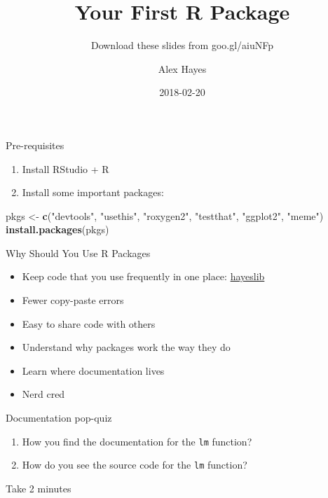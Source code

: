 \documentclass[12pt,ignorenonframetext,compress]{beamer}
\title{Your First R Package}
\subtitle{Download these slides from goo.gl/aiuNFp}
\author{Alex Hayes}
\date{2018-02-20}
\newenvironment{Shaded}{\begin{snugshade}}{\end{snugshade}}
\newcommand{\KeywordTok}[1]{\textcolor[rgb]{0.13,0.29,0.53}{\textbf{#1}}}
\newcommand{\StringTok}[1]{\textcolor[rgb]{0.31,0.60,0.02}{#1}}
\newcommand{\NormalTok}[1]{#1}
\providecommand{\tightlist}{%
  \setlength{\itemsep}{0pt}\setlength{\parskip}{0pt}}
\begin{document}
\frame{\titlepage}

\begin{frame}[fragile]{Pre-requisites}

\begin{enumerate}
\def\labelenumi{\arabic{enumi}.}
\item
  Install RStudio + R
\item
  Install some important packages:
\end{enumerate}

\begin{Shaded}
\begin{Highlighting}[]
\NormalTok{pkgs <-}\StringTok{ }\KeywordTok{c}\NormalTok{(}\StringTok{"devtools"}\NormalTok{, }\StringTok{"usethis"}\NormalTok{,}
          \StringTok{"roxygen2"}\NormalTok{, }\StringTok{"testthat"}\NormalTok{,}
          \StringTok{"ggplot2"}\NormalTok{, }\StringTok{"meme"}\NormalTok{)}
\KeywordTok{install.packages}\NormalTok{(pkgs)}
\end{Highlighting}
\end{Shaded}

\end{frame}

\begin{frame}{Why Should You Use R Packages}

\begin{itemize}
\tightlist
\item
  Keep code that you use frequently in one place:
  \href{https://github.com/alexpghayes/hayeslib}{hayeslib}
\item
  Fewer copy-paste errors
\item
  Easy to share code with others
\item
  Understand why packages work the way they do
\item
  Learn where documentation lives
\item
  Nerd cred
\end{itemize}

\end{frame}

\begin{frame}[fragile]{Documentation pop-quiz}

\begin{enumerate}
\def\labelenumi{\arabic{enumi}.}
\tightlist
\item
  How you find the documentation for the \texttt{lm} function?
\item
  How do you see the source code for the \texttt{lm} function?
\end{enumerate}

Take 2 minutes

\end{frame}
\end{document}
